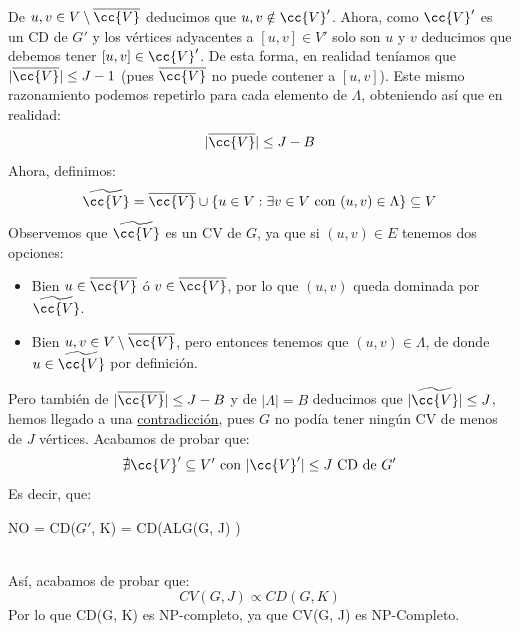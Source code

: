 \documentclass[12pt]{article}
\newcommand{\CD}{CD(G, K) }
\newcommand{\CV}{CV(G, J) }
\newcommand{\ALG}{ALG(G, J) }
\begin{document}
    \noindent
    De $u,v\in V\setminus \overline{\cc{V}}$ deducimos que $u,v\notin \cc{V}'$. Ahora, como $\cc{V}'$ es un CD de $G'$ y los vértices adyacentes a $[u,v]\in V'$ solo son $u$ y $v$ deducimos que debemos tener $[u,v]\in \cc{V}'$. De esta forma, en realidad teníamos que $|\overline{\cc{V}}|\leq J-1$ (pues $\overline{\cc{V}}$ no puede contener a $[u,v]$). Este mismo razonamiento podemos repetirlo para cada elemento de $\Lambda$, obteniendo así que en realidad:
    \begin{equation*}
        |\overline{\cc{V}}| \leq J-B
    \end{equation*}
    Ahora, definimos:
    \begin{equation*}
        \widetilde{\cc{V}} = \overline{\cc{V}} \cup \{u \in V : \exists v\in V \text{\ con\ } (u,v)\in \Lambda\} \subseteq V
    \end{equation*}
    Observemos que $\widetilde{\cc{V}}$ es un CV de $G$, ya que si $(u,v)\in E$ tenemos dos opciones:
    \begin{itemize}
        \item Bien $u\in \overline{\cc{V}}$ ó $v\in \overline{\cc{V}}$, por lo que $(u,v)$ queda dominada por $\widetilde{\cc{V}}$.
        \item Bien $u,v\in V\setminus \overline{\cc{V}}$, pero entonces tenemos que $(u,v)\in \Lambda$, de donde $u\in \widetilde{\cc{V}}$ por definición.
    \end{itemize}
    Pero también de $|\overline{\cc{V}}|\leq J-B$ y de $|\Lambda| = B$ deducimos que $|\widetilde{\cc{V}}| \leq J$, hemos llegado a una \underline{contradicción}, pues $G$ no podía tener ningún CV de menos de $J$ vértices. Acabamos de probar que:
    \begin{equation*}
        \nexists \cc{V}'\subseteq V' \text{\ con\ } |\cc{V}'|\leq J \text{\ CD de\ } G'
    \end{equation*}
    Es decir, que:
    \begin{center}
        NO = CD($G'$, K) = CD(\ALG)
    \end{center}~\\
    Así, acabamos de probar que:
    \begin{equation*}
        \boxed{\CV \propto \CD} 
    \end{equation*}
    Por lo que \CD es NP-completo, ya que \CV es NP-Completo.
\end{document}
